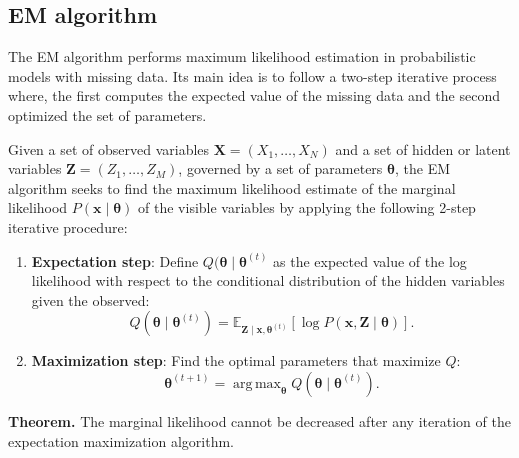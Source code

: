 \documentclass[11pt]{article}
\theoremstyle{definition}
\DeclareMathOperator*{\argmax}{arg\,max} %
\begin{document}
\subsection{EM algorithm}
The EM algorithm performs maximum likelihood estimation in probabilistic models with missing data. Its main idea is to follow a two-step iterative process where, the first computes the expected value of the missing data and the second optimized the set of parameters.

Given a set of observed variables \( \bm{X} = (X_1,\dots, X_N) \) and a set of hidden or latent variables \( \bm{Z} = (Z_1, \dots, Z_M) \), governed by a set of parameters \( \bm{\theta} \), the EM algorithm seeks to find the maximum likelihood estimate of the marginal likelihood \( P(\bm{x} \mid \bm{\theta}) \)  of the visible variables by applying the following 2-step iterative procedure:
\begin{enumerate}
  \item \textbf{Expectation step}: Define \( Q(\bm{\theta} \mid \bm{\theta}^{(t)} \) as the expected value of the log likelihood with respect to the conditional distribution  of the hidden variables given the observed:
  \[
       Q(\bm{\theta} \mid \bm{\theta}^{(t)}) = \mathbb{E}_{\bm{Z} \mid \bm{x}, \bm{\theta}^{(t)}} \left[ \log P(\bm{x}, \bm{Z} \mid \bm{\theta}) \right].
  \]
  \item \textbf{Maximization step}: Find the optimal parameters that maximize \( Q \):
  \[
       \bm{\theta}^{(t+1)} = \argmax_{\bm{\theta}} Q(\bm{\theta} \mid \bm{\theta}^(t)).
  \]
\end{enumerate}

\textbf{Theorem. }The marginal likelihood cannot be decreased after any iteration of the expectation maximization algorithm.
\end{document}
